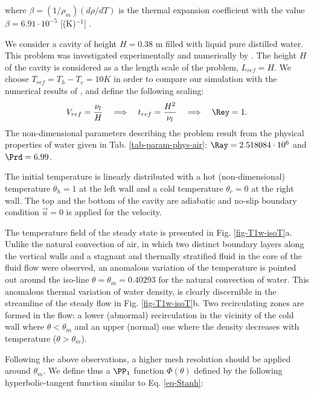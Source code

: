 \noindent where $\beta=(1/\rho_m) \left(d\rho/dT\right)$ is the thermal expansion coefficient with the value $\beta=6.91 \cdot 10^{-5}$ [(K)$^{-1}$] \citep{Scanlon2004}.

We consider a cavity of height $H = 0.38$ m filled with liquid pure distilled water.
This problem was investigated experimentally and numerically by \cite{Giangi-2000,Kowalewski-1999,Kowalewski-2003}.
The height $H$ of the cavity is considered as a the length scale of the problem, $L_{ref} = H$. 
We choose $T_{ref} = T_h - T_c = 10 K$ in order to compare our simulation with the numerical results of \cite{Kowalewski-2003},
and define the following scaling:
\begin{equation} \label{eq-def-scal-1}
   V_{ref} = \frac{\nu_l}{H} 
   \quad \Longrightarrow \quad t_{ref} = \frac{H^2}{\nu_l}
   \quad \Longrightarrow \quad \Rey = 1.
\end{equation} 
The non-dimensional parameters describing the problem result from the physical properties of water given in Tab. \ref{tab-param-phys-air}: $\Ray=2.518084\cdot 10^{6}$ and $\Prd=6.99$. 

\noindent The initial temperature is linearly distributed with a hot (non-dimensional) temperature $\theta_h =1$ at the left wall and a cold temperature $\theta_c=0$ at the right wall. 
The top and the bottom of the cavity are adiabatic and no-slip boundary condition $\vec u = 0$ is applied for the velocity.

The temperature field of the steady state is presented in Fig. \ref{fig-T1w-isoT}a.
Unlike the natural convection of air, in which two distinct boundary layers along the vertical walls and a stagnant and thermally stratified fluid in the core of the fluid flow were observed, an anomalous variation of the temperature is pointed out around the iso-line $\theta = \theta_m = 0.40293$ for the natural convection of water.
This anomalous thermal variation of water density, is clearly discernible in the streamline of the steady flow in Fig. \ref{fig-T1w-isoT}b.
Two recirculating zones are formed in the flow: a lower (abnormal) recirculation  in the vicinity of the cold wall where $\theta<\theta_m$ and an upper (normal) one where the density decreases with temperature ($\theta>\theta_m$).

Following the above observations, a higher mesh resolution should be applied around $\theta_m$.
We define thus a $\PP_1$ function $\Phi(\theta)$ defined by the following hyperbolic-tangent function similar to Eq. \eqref{eq-Stanh}:

